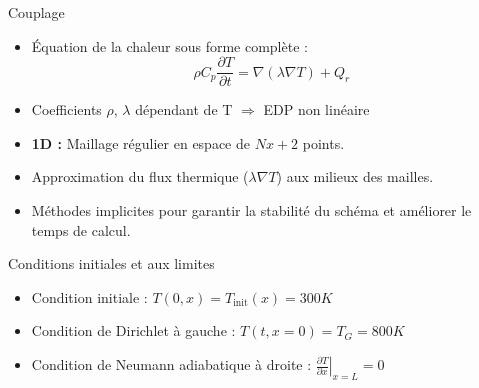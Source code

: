 \documentclass{beamer}
\begin{document}
\begin{frame}{Couplage}
    \begin{itemize}
        \item Équation de la chaleur sous forme complète :
        \begin{equation}
            \rho C_p \frac{\partial T}{\partial t} = \nabla(\lambda \nabla T) + Q_r
        \end{equation}
        \item Coefficients $\rho$, $\lambda$ dépendant de T $\Longrightarrow$ EDP non linéaire
    \end{itemize}
    
    \begin{itemize}
        \item \textbf{1D :} Maillage régulier en espace de $Nx + 2$ points.
        \item Approximation du flux thermique ($\lambda \nabla T$) aux milieux des mailles.
        \item Méthodes implicites pour garantir la stabilité du schéma et améliorer le temps de calcul.
    \end{itemize}
    \begin{block}{Conditions initiales et aux limites}
        \begin{itemize}
            \item Condition initiale : $T(0,x) = T_{\text{init}}(x) = 300 K$
            \item Condition de Dirichlet à gauche : $T(t, x=0) = T_G = 800 K$
            \item Condition de Neumann adiabatique à droite : $\left. \frac{\partial T}{\partial x} \right|_{x = L} = 0$
        \end{itemize}
    \end{block}
    
\end{frame}
\end{document}
